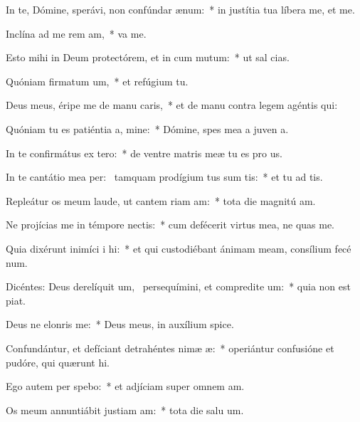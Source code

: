 \item In te, Dómine, sperávi, non confúndar  ænum:~* in justítia tua líbera me, et  me.
\item Inclína ad me rem am,~*  va me.
\item Esto mihi in Deum protectórem, et in cum mutum:~* ut sal  cias.
\item Quóniam firmatum um,~* et refúgium   tu.
\item Deus meus, éripe me de manu caris,~* et de manu contra legem agéntis  qui:
\item Quóniam tu es patiéntia a, mine:~* Dómine, spes mea a juven a.
\item In te confirmátus  ex tero:~* de ventre matris meæ tu es pro us.
\item In te cantátio mea per:~\pscross{} tamquam prodígium tus sum tis:~* et tu ad tis.
\item Repleátur os meum laude, ut cantem riam am:~* tota die magnitú am.
\item Ne projícias me in témpore nectis:~* cum defécerit virtus mea, ne quas me.
\item Quia dixérunt inimíci i hi:~* et qui custodiébant ánimam meam, consílium fecé  num.
\item Dicéntes: Deus derelíquit um,~\pscross{} persequímini, et compredite um:~* quia non est  piat.
\item Deus ne elonris  me:~* Deus meus, in auxílium  spice.
\item Confundántur, et defíciant detrahéntes nimæ æ:~* operiántur confusióne et pudóre, qui quærunt  hi.
\item Ego autem per spebo:~* et adjíciam super omnem  am.
\item Os meum annuntiábit justiam am:~* tota die salu um.
